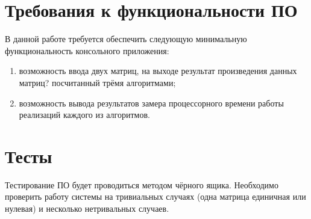     \section{Требования к функциональности ПО}
        В данной работе требуется обеспечить следующую минимальную функциональность консольного приложения:
        \begin{enumerate}
            \item возможность ввода двух матриц, на выходе результат произведения данных матриц? посчитанный трёмя алгоритмами;
            \item возможность вывода результатов замера процессорного времени работы реализаций каждого из алгоритмов. 
        \end{enumerate}

    \section{Тесты}
    Тестирование ПО будет проводиться методом чёрного ящика. Необходимо проверить работу системы 
    на тривиальных случаях (одна матрица единичная или нулевая) 
    и несколько нетривальных случаев.

\newpage